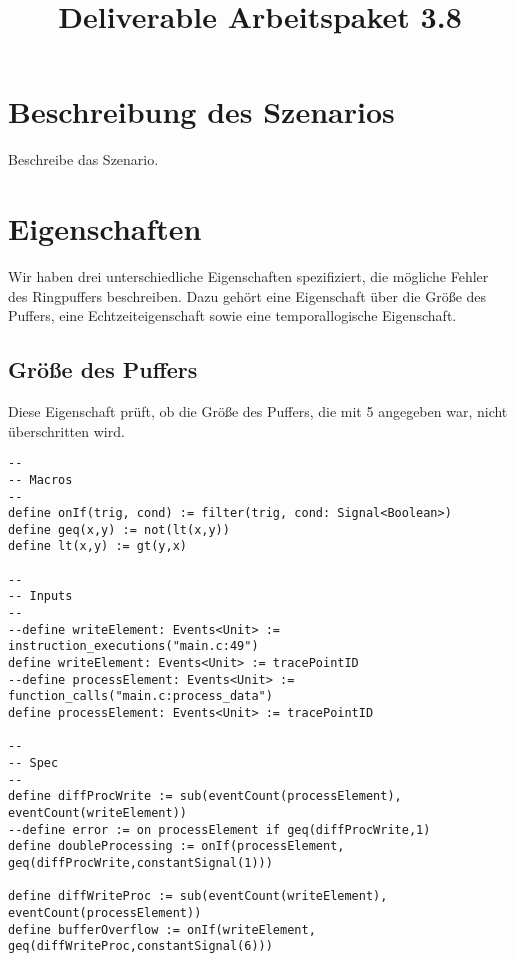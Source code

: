 \documentclass{article}
\title{Deliverable Arbeitspaket 3.8}
\title{\thetitle}
\begin{document}
\maketitle

\section{Beschreibung des Szenarios}

Beschreibe das Szenario.

\section{Eigenschaften}

Wir haben drei unterschiedliche Eigenschaften spezifiziert, die mögliche Fehler des Ringpuffers beschreiben. Dazu gehört eine Eigenschaft über die Größe des Puffers, eine Echtzeiteigenschaft sowie eine temporallogische Eigenschaft.

\subsection{Größe des Puffers}

Diese Eigenschaft prüft, ob die Größe des Puffers, die mit 5 angegeben war, nicht überschritten wird.

\begin{lstlisting}[language=tessla+salt]
--
-- Macros
--
define onIf(trig, cond) := filter(trig, cond: Signal<Boolean>)
define geq(x,y) := not(lt(x,y))
define lt(x,y) := gt(y,x)

--
-- Inputs
--
--define writeElement: Events<Unit> := instruction_executions("main.c:49")
define writeElement: Events<Unit> := tracePointID
--define processElement: Events<Unit> := function_calls("main.c:process_data")
define processElement: Events<Unit> := tracePointID

--
-- Spec
--
define diffProcWrite := sub(eventCount(processElement), eventCount(writeElement))
--define error := on processElement if geq(diffProcWrite,1)
define doubleProcessing := onIf(processElement, geq(diffProcWrite,constantSignal(1)))

define diffWriteProc := sub(eventCount(writeElement), eventCount(processElement))
define bufferOverflow := onIf(writeElement, geq(diffWriteProc,constantSignal(6)))
\end{lstlisting}
\end{document}
